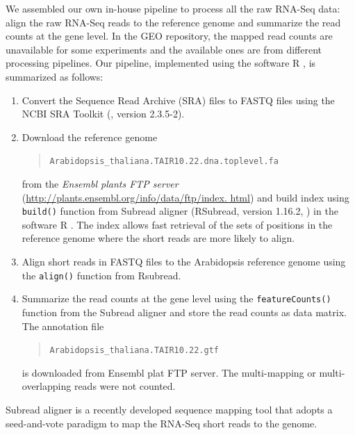 \documentclass[letterpaper,12pt]{article}
\begin{document}
 
We assembled our own in-house pipeline to process all the raw RNA-Seq data:
align the raw RNA-Seq reads to the reference genome and summarize the read counts at the 
gene level. In the GEO repository, the
mapped read counts are unavailable for some experiments and the available ones
are from different processing pipelines.  
Our pipeline, implemented using the software R \citep{Rpackage}, is summarized as follows: 
\begin{enumerate}
    \item Convert the Sequence Read Archive (SRA) files to FASTQ files using the NCBI SRA Toolkit (\cite{leinonen2010sequence}, version 2.3.5-2).
    \item Download the reference genome 
         \begin{quote}
    	\verb|Arabidopsis_thaliana.TAIR10.22.dna.toplevel.fa |
    \end{quote} 
    from the \textit{ Ensembl plants FTP server} (\url{http://plants.ensembl.org/info/data/ftp/index. html}) and build index using \verb|build()| function from 
    Subread aligner (RSubread, version 1.16.2, \citealt{liao2013subread}) in the software R
    \citep{ Rpackage}. The index allows fast retrieval of the sets of positions in the reference genome where the short reads are more likely to align. 
    \item Align short reads in FASTQ files to the Arabidopsis reference genome using the \verb|align()| function from Rsubread. 
 \item
     Summarize the read counts at the gene level using the \verb|featureCounts()| function from the
     Subread aligner
     and store the read counts as data matrix.  
     The annotation file 
     \begin{quote}
     \verb"Arabidopsis_thaliana.TAIR10.22.gtf" 
 \end{quote}
     is
     downloaded from Ensembl plat FTP server. The multi-mapping or
     multi-overlapping  reads were not counted.  

\end{enumerate}
Subread aligner is a recently developed sequence mapping tool that adopts a
seed-and-vote paradigm to map the RNA-Seq short reads to the genome. 
\end{document}
